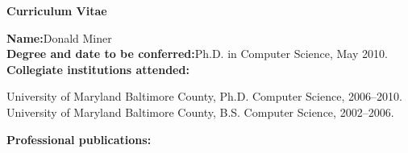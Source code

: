 \begin{titlepage}

\begin{center}
\vspace{0.1in}
\large{\bf Curriculum Vitae}
\bigskip \bigskip
\end{center}

\begin{flushleft}
  {\bf Name:}{\hspace{3mm}}Donald Miner\\
	{\bf Degree and date to be conferred:}{\hspace{3mm}}Ph.D. in Computer Science, May 2010. \\
	{\bf Collegiate institutions attended:}\\
	\begin{singlespace} 
	{\hspace{0.4in}}University of Maryland Baltimore County, Ph.D. Computer Science, 2006--2010. \\
	{\hspace{0.4in}}University of Maryland Baltimore County, B.S. Computer Science, 2002--2006. \\
	\end{singlespace} 
	\vspace{8pt}
	{\bf Professional publications:}\\
	\begin{singlespace} 


\end{singlespace}
\end{flushleft}
\end{titlepage}
